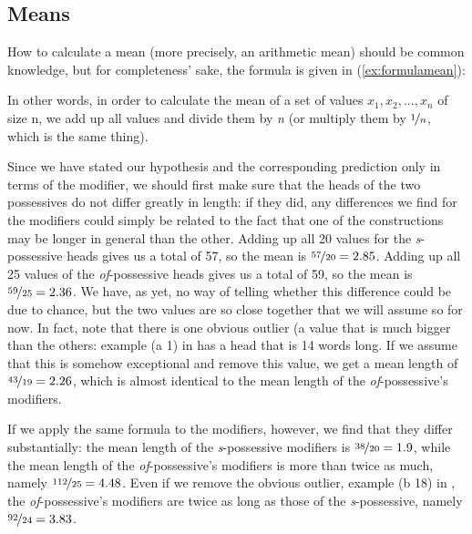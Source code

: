 \subsection{Means}
\label{sec:means}

How to calculate a mean  (more precisely, an arithmetic mean) should be common knowledge, but for completeness' sake, the formula is given in (\ref{ex:formulamean}):

\begin{exe}
\ex {}
\end{exe}

In other words, in order to calculate the mean  of a set of values $x_1, x_2, ..., x_n$ of size n, we add up all values and divide them by \textit{n} (or multiply them by $\nicefrac{1}{n}$, which is the same thing).

Since we have stated our hypothesis  and the corresponding prediction only in terms of the modifier, we should first make sure that the heads of the two possessives  do not differ greatly in length:  if they did, any differences we find for the modifiers could simply be related to the fact that one of the constructions may be longer in general than the other. Adding up all 20 values for the \textit{s}-possessive heads gives us a total of 57, so the mean  is $\nicefrac{57}{20} = 2.85$. Adding up all 25 values of the \textit{of}-possessive heads gives us a total of 59, so the mean is $\nicefrac{59}{25} = 2.36$. We have, as yet, no way of telling whether this difference could be due to chance,  but the two values are so close together that we will assume so for now. In fact, note that there is one obvious outlier (a value that is much bigger than the others: example (a 1) in  has a head that is 14 words long. If we assume that this is somehow exceptional and remove this value, we get a mean  length  of $\nicefrac{43}{19} = 2.26$, which is almost identical to the mean length of the \textit{of}-possessive's  modifiers.

If we apply the same formula to the modifiers, however, we find that they differ substantially: the mean  length  of the \textit{s}-possessive  modifiers is $\nicefrac{38}{20} = 1.9$, while the mean length of the \textit{of}-possessive's modifiers is more than twice as much, namely $\nicefrac{112}{25} = 4.48$. Even if we remove the obvious outlier, example (b 18) in , the \textit{of}-possessive's modifiers are twice as long as those of the \textit{s}-possessive, namely $\nicefrac{92}{24} = 3.83$.

